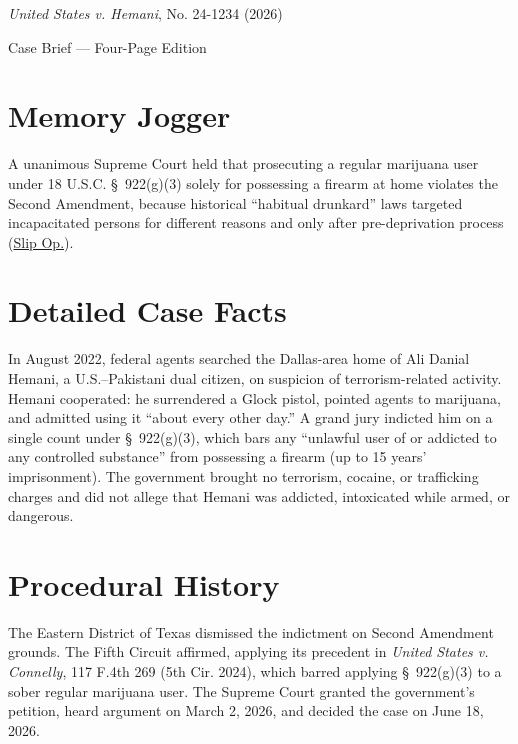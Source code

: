 \documentclass[12pt]{article}
\begin{document}
\begin{center}
{\LARGE \textit{United States v. Hemani}, No. 24-1234 (2026)\par}
\vspace{0.8em}
{\large Case Brief --- Four-Page Edition\par}
\end{center}
\vspace{1em}

\section{Memory Jogger}

A unanimous Supreme Court held that prosecuting a regular marijuana user under 18 U.S.C. \S~922(g)(3) solely for possessing a firearm at home violates the Second Amendment, because historical ``habitual drunkard'' laws targeted incapacitated persons for different reasons and only after pre-deprivation process (\href{https://www.supremecourt.gov/opinions/25pdf/24-1234_g2bh.pdf}{Slip Op.}).

\section{Detailed Case Facts}

In August 2022, federal agents searched the Dallas-area home of Ali Danial Hemani, a U.S.--Pakistani dual citizen, on suspicion of terrorism-related activity. Hemani cooperated: he surrendered a Glock pistol, pointed agents to marijuana, and admitted using it ``about every other day.'' A grand jury indicted him on a single count under \S~922(g)(3), which bars any ``unlawful user of or addicted to any controlled substance'' from possessing a firearm (up to 15 years' imprisonment). The government brought no terrorism, cocaine, or trafficking charges and did not allege that Hemani was addicted, intoxicated while armed, or dangerous.

\section{Procedural History}

The Eastern District of Texas dismissed the indictment on Second Amendment grounds. The Fifth Circuit affirmed, applying its precedent in \textit{United States v. Connelly}, 117 F.4th 269 (5th Cir. 2024), which barred applying \S~922(g)(3) to a sober regular marijuana user. The Supreme Court granted the government's petition, heard argument on March 2, 2026, and decided the case on June 18, 2026.
\end{document}
